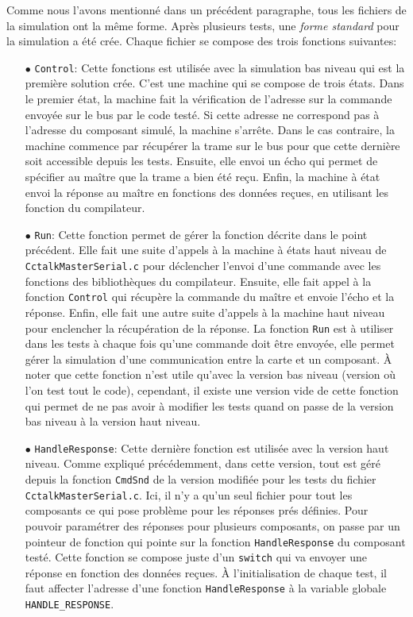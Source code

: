 \documentclass[a4paper]{article}
\begin{document}
Comme nous l'avons mentionné dans un précédent paragraphe, tous les fichiers de
la simulation ont la même forme. Après plusieurs tests, une \textit{forme
standard} pour la simulation a été crée. Chaque fichier se compose des trois
fonctions suivantes:
\begin{itemize}
  \item[$\bullet$] \verb|Control|: Cette fonctions est utilisée avec la
    simulation bas niveau qui est la première solution crée. C'est une machine
    qui se compose de trois états. Dans le premier état, la machine fait la
    vérification de l'adresse sur la commande envoyée sur le bus par le code
    testé. Si cette adresse ne correspond pas à l'adresse du composant simulé,
    la machine s'arrête. Dans le cas contraire, la machine commence par
    récupérer la trame sur le bus pour que cette dernière soit accessible depuis
    les tests. Ensuite, elle envoi un écho qui permet de spécifier au maître que
    la trame a bien été reçu. Enfin, la machine à état envoi la réponse au
    maître en fonctions des données reçues, en utilisant les fonction du
    compilateur. %
  \item[$\bullet$] \verb|Run|: Cette fonction permet de gérer la fonction
    décrite dans le point précédent. Elle fait une suite d'appels à la machine à
    états haut niveau de \verb|CctalkMasterSerial.c| pour déclencher l'envoi
    d'une commande avec les fonctions des bibliothèques du compilateur. Ensuite,
    elle fait appel à la fonction \verb|Control| qui récupère la commande du
    maître et envoie l'écho et la réponse. Enfin, elle fait une autre suite
    d'appels à la machine haut niveau pour enclencher la récupération de la
    réponse. La fonction \verb|Run| est à utiliser dans les tests à chaque fois
    qu'une commande doit être envoyée, elle permet gérer la simulation d'une
    communication entre la carte et un composant. À noter que cette fonction
    n'est utile qu'avec la version bas niveau (version où l'on test tout le
    code), cependant, il existe une version vide de cette fonction qui permet de
    ne pas avoir à modifier les tests quand on passe de la version bas niveau à
    la version haut niveau.
  \item[$\bullet$] \verb|HandleResponse|: Cette dernière fonction est utilisée
    avec la version haut niveau. Comme expliqué précédemment, dans cette
    version, tout est géré depuis la fonction \verb|CmdSnd| de la version
    modifiée pour les tests du fichier \verb|CctalkMasterSerial.c|. Ici, il n'y
    a qu'un seul fichier pour tout les composants ce qui pose problème pour les
    réponses prés définies. Pour pouvoir paramétrer des réponses pour plusieurs
    composants, on passe par un pointeur de fonction qui pointe sur la fonction
    \verb|HandleResponse| du composant testé. Cette fonction se compose juste
    d'un \verb|switch| qui va envoyer une réponse en fonction des données
    reçues. À l'initialisation de chaque test, il faut affecter l'adresse d'une
    fonction \verb|HandleResponse| à la variable globale \verb|HANDLE_RESPONSE|.
\end{itemize}
\end{document}
